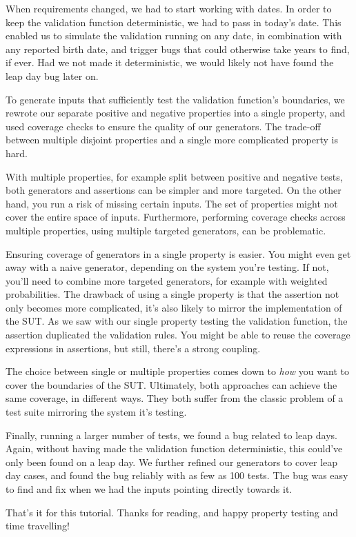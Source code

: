 When requirements changed, we had to start working with dates. In order
to keep the validation function deterministic, we had to pass in today's
date. This enabled us to simulate the validation running on any date, in
combination with any reported birth date, and trigger bugs that could
otherwise take years to find, if ever. Had we not made it deterministic,
we would likely not have found the leap day bug later on.

To generate inputs that sufficiently test the validation function's
boundaries, we rewrote our separate positive and negative properties
into a single property, and used coverage checks to ensure the quality
of our generators. The trade-off between multiple disjoint properties
and a single more complicated property is hard.

With multiple properties, for example split between positive and
negative tests, both generators and assertions can be simpler and more
targeted. On the other hand, you run a risk of missing certain inputs.
The set of properties might not cover the entire space of inputs.
Furthermore, performing coverage checks across multiple properties,
using multiple targeted generators, can be problematic.

Ensuring coverage of generators in a single property is easier. You
might even get away with a naive generator, depending on the system
you're testing. If not, you'll need to combine more targeted generators,
for example with weighted probabilities. The drawback of using a single
property is that the assertion not only becomes more complicated, it's
also likely to mirror the implementation of the SUT. As we saw with our
single property testing the validation function, the assertion
duplicated the validation rules. You might be able to reuse the coverage
expressions in assertions, but still, there's a strong coupling.

The choice between single or multiple properties comes down to
\emph{how} you want to cover the boundaries of the SUT. Ultimately, both
approaches can achieve the same coverage, in different ways. They both
suffer from the classic problem of a test suite mirroring the system
it's testing.

Finally, running a larger number of tests, we found a bug related to
leap days. Again, without having made the validation function
deterministic, this could've only been found on a leap day. We further
refined our generators to cover leap day cases, and found the bug
reliably with as few as 100 tests. The bug was easy to find and fix when
we had the inputs pointing directly towards it.

That's it for this tutorial. Thanks for reading, and happy property
testing and time travelling!
